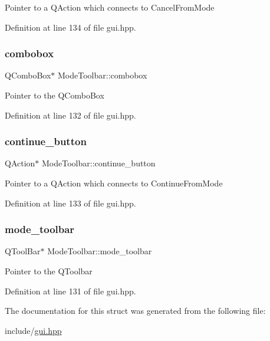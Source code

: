 Pointer to a Q\+Action which connects to Cancel\+From\+Mode 

Definition at line 134 of file gui.\+hpp.

\mbox{\label{structModeToolbar_ad0ba4f03ef2a44e2543add404a50b4f1}} 
\subsubsection{\texorpdfstring{combobox}{combobox}}
{\footnotesize\ttfamily Q\+Combo\+Box$\ast$ Mode\+Toolbar\+::combobox}

Pointer to the Q\+Combo\+Box 

Definition at line 132 of file gui.\+hpp.

\mbox{\label{structModeToolbar_af7d7766f5b1710abb382c42689e963ca}} 
\subsubsection{\texorpdfstring{continue\+\_\+button}{continue\_button}}
{\footnotesize\ttfamily Q\+Action$\ast$ Mode\+Toolbar\+::continue\+\_\+button}

Pointer to a Q\+Action which connects to Continue\+From\+Mode 

Definition at line 133 of file gui.\+hpp.

\mbox{\label{structModeToolbar_acc6bcdd91825343f34ec38d312418234}} 
\subsubsection{\texorpdfstring{mode\+\_\+toolbar}{mode\_toolbar}}
{\footnotesize\ttfamily Q\+Tool\+Bar$\ast$ Mode\+Toolbar\+::mode\+\_\+toolbar}

Pointer to the Q\+Toolbar 

Definition at line 131 of file gui.\+hpp.



The documentation for this struct was generated from the following file\+:\begin{DoxyCompactItemize}
\item 
include/\mbox{\hyperlink{gui_8hpp}{gui.\+hpp}}\end{DoxyCompactItemize}
